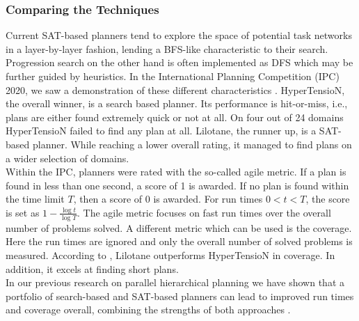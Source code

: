 \begin{comment}
- grounding can be an expensive operation \cite{behnke2020succinct}
- grounding is an active field of research within hierarchical planning \cite{ramoul2017grounding}, \cite{behnke2020succinct}
- a discussion on the benefits and trade-offs of grounding is available in \cite{schreiber2021lilotane}
- grounded representations can have more information available for subsequent pruning, i.e. only a certain parameter combination for a reduction may be invalid but not a whole method
- lifted representations can be a lot more compact 

- efficient grounding is its own research area \cite{behnke2020succinct} \todo{cite the other comparison papers from behnke's work}


- lifted vs grounded
- Lilotane, HyperTensioN
- Panda, CrowdHTN, Tree-Rex
- lifted: more general, less pruning?
\end{comment}

\subsubsection{Comparing the Techniques}
Current SAT-based planners tend to explore the space of potential task networks in a layer-by-layer fashion, lending a BFS-like characteristic to their search. Progression search on the other hand is often implemented as DFS which may be further guided by heuristics. In the International Planning Competition (IPC) 2020, we saw a demonstration of these different characteristics \cite{behnke2020ipcresults}. HyperTensioN, the overall winner, is a search based planner. Its performance is hit-or-miss, i.e., plans are either found extremely quick or not at all. On four out of 24 domains HyperTensioN failed to find any plan at all. Lilotane, the runner up, is a SAT-based planner. While reaching a lower overall rating, it managed to find plans on a wider selection of domains. \\
Within the IPC, planners were rated with the so-called agile metric. If a plan is found in less than one second, a score of 1 is awarded. If no plan is found within the time limit $T$, then a score of 0 is awarded. For run times $0 < t < T$, the score is set as $1 - \frac{\log{t}}{\log{T}}$. The agile metric focuses on fast run times over the overall number of problems solved. A different metric which can be used is the coverage. Here the run times are ignored and only the overall number of solved problems is measured. According to \cite{schreiber2021lilotane}, Lilotane outperforms HyperTensioN in coverage. In addition, it excels at finding short plans. \\
In our previous research on parallel hierarchical planning we have shown that a portfolio of search-based and SAT-based planners can lead to improved run times and coverage overall, combining the strengths of both approaches \cite{bretl2021parallel}.

